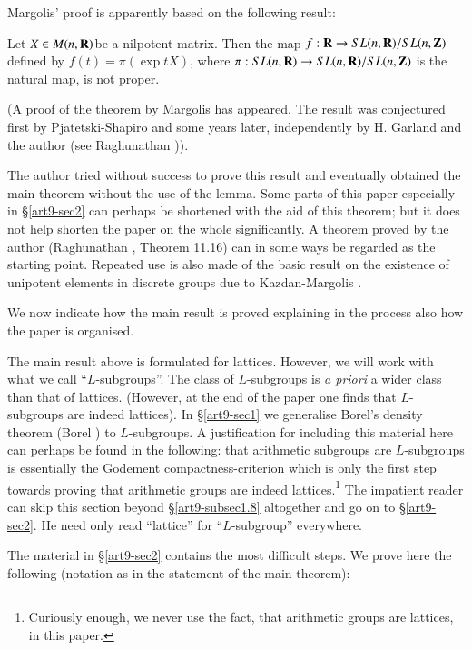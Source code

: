 Margolis' proof is apparently based on the following result:

\begin{theorem*}
Let $X \in M(n, \mathbf{R})$\pageoriginale be a nilpotent matrix. Then the map $f: \mathbf{R} \to SL (n, \mathbf{R})/SL(n,\mathbf{Z})$ defined by $f(t) = \pi(\exp t X)$, where $\pi: SL (n, \mathbf{R}) \to S L (n, \mathbf{R})/ SL (n,\mathbf{Z})$ is the natural map, is not proper.
\end{theorem*}

(A proof of the theorem by Margolis \cite{art9-margolis-2} has appeared. The result was conjectured first by Pjatetski-Shapiro \cite{art9-pjatetski-1} and some years later, independently by H. Garland and the author (see Raghunathan \cite{art9-raghunathan-4})).

The author tried without success to prove this result and eventually obtained the main theorem without the use of the lemma. Some parts of this paper especially in \S \ref{art9-sec2} can perhaps be shortened with the aid of this theorem; but it does not help shorten the paper on the whole significantly. A theorem proved by the author (Raghunathan \cite{art9-raghunathan-1}, Theorem 11.16) can in some ways be regarded as the starting point. Repeated use is also made of the basic result on the existence of unipotent elements in discrete groups due to Kazdan-Margolis \cite{art9-kazdan-margolis-1}.

We now indicate how the main result is proved explaining in the process also how the paper is organised.

The main result above is formulated for lattices. However, we will work with what we call ``$L$-subgroups''. The class of $L$-subgroups is \textit{a priori} a wider class than that of lattices. (However, at the end of the paper one finds that $L$-subgroups are indeed lattices). In \S \ref{art9-sec1} we generalise Borel's density theorem (Borel \cite{art9-borel-1}) to $L$-subgroups. A justification for including this material here can perhaps be found in the following: that arithmetic subgroups are $L$-subgroups is essentially the Godement compactness-criterion which is only the first step towards proving that arithmetic groups are indeed lattices.\footnote{Curiously enough, we never use the fact, that arithmetic groups are lattices, in this paper.} The impatient reader can skip this section beyond \S \ref{art9-subsec1.8} altogether and go on to \S \ref{art9-sec2}. He need only read ``lattice'' for ``$L$-subgroup'' everywhere.

The material in \S \ref{art9-sec2} contains the most difficult steps.  We prove here the following (notation as in the statement of the main theorem):


